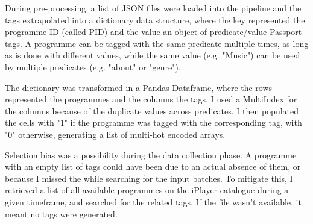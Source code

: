 During pre-processing, a list of JSON files were loaded into the pipeline and the tags extrapolated into a dictionary data structure, where the key represented
the programme ID (called PID) and the value an object of predicate/value Passport tags. A programme can be tagged with the same predicate multiple times,
as long as is done with different values, while the same value (e.g. "Music") can be used by multiple predicates (e.g. "about" or "genre").

The dictionary was transformed in a Pandas Dataframe, where the rows represented the programmes and the columns the tags.
I used a MultiIndex \cite{Pandas:MultiIndex} for the columns because of the duplicate values across predicates.
I then populated the cells with "1" if the programme was tagged with the corresponding tag, with "0" otherwise, generating a
list of multi-hot encoded arrays.

Selection bias was a possibility during the data collection phase. A programme with an empty list of tags could have been due to
an actual absence of them, or because I missed the while searching for the input batches. To mitigate this, I retrieved a list
of all available programmes on the iPlayer catalogue during a given timeframe, and searched for the related tags.
If the file wasn't available, it meant no tags were generated.

